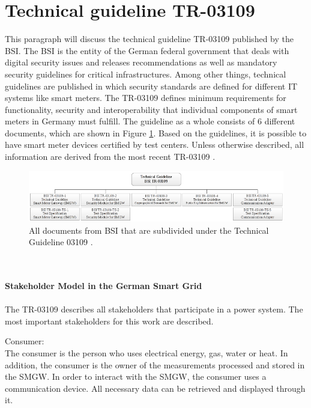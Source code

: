 \section{Technical guideline TR-03109}
\label{sec:TR_03109}
This paragraph will discuss the technical guideline \gls{TR-03109} published by the \gls{BSI}. The \gls{BSI} is the entity of the German federal government that deals with digital security issues and releases recommendations as well as mandatory security guidelines for critical infrastructures. Among other things, technical guidelines are published in which security standards are defined for different IT systems like smart meters. The \gls{TR-03109} defines minimum requirements for functionality, security and interoperability that individual components of smart meters in Germany must fulfill. The guideline as a whole consists of 6 different documents, which are shown in Figure \ref{fig:TG03109}. Based on the guidelines, it is possible to have smart meter devices certified by test centers. Unless otherwise described, all information are derived from the most recent \gls{TR-03109} \cite{TR-031}.\begin{figure}[tbp]
  \centering
  \includegraphics[width=1\textwidth]{images/BSI-TR-03109.png}
  \caption[Technical Guideline 03109 Overview]{All documents from \gls{BSI} that are subdivided under the Technical Guideline 03109 \cite{Anna}.}
  \label{fig:TG03109}
\end{figure}
\\%
\\
\textbf{Stakeholder Model in the German Smart Grid}
\label{subsec:stakeholder_model}
\\
\\
The \gls{TR-03109} describes all stakeholders that participate in a power system. The most important stakeholders for this work are described.
\\\item Consumer: \\
The consumer is the person who uses electrical energy, gas, water
or heat. In addition, the consumer is the owner of the measurements processed and stored in the \gls{SMGW}. In order to interact with the \gls{SMGW}, the consumer uses a communication device. All necessary data can be retrieved and displayed through it.\\
